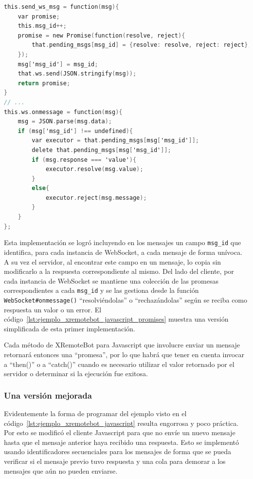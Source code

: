 \begin{lstlisting}[language=C,
caption={Ejemplo simplificado de la implementación de XRemoteBot con
Promises dentro del constructor Server en xremotebot.js},
label=lst:ejemplo_xremotebot_javascript_promises]
this.send_ws_msg = function(msg){
    var promise;
    this.msg_id++;
    promise = new Promise(function(resolve, reject){
        that.pending_msgs[msg_id] = {resolve: resolve, reject: reject};
    });
    msg['msg_id'] = msg_id;
    that.ws.send(JSON.stringify(msg));
    return promise;
}
// ...
this.ws.onmessage = function(msg){
    msg = JSON.parse(msg.data);
    if (msg['msg_id'] !== undefined){
        var executor = that.pending_msgs[msg['msg_id']];
        delete that.pending_msgs[msg['msg_id']];
        if (msg.response === 'value'){
            executor.resolve(msg.value);
        }
        else{
            executor.reject(msg.message);
        }
    }
};
\end{lstlisting}

Esta implementación se logró incluyendo en los mensajes un campo
\texttt{msg\_id} que identifica, para cada instancia de WebSocket, a
cada mensaje de forma unívoca. A su vez el servidor, al encontrar este
campo en un mensaje, lo copia sin modificarlo a la respuesta correspondiente
al mismo. Del lado del cliente, por cada instancia de WebSocket se mantiene
una colección de las promesas correspondientes
a cada \texttt{msg\_id} y se las gestiona desde la función
\texttt{WebSocket\#onmessage()} ``resolviéndolas'' o ``rechazándolas'' según
se reciba como respuesta un valor o un error. El
código~\ref{lst:ejemplo_xremotebot_javascript_promises} muestra una versión
simplificada de esta primer implementación.

Cada método de XRemoteBot para Javascript que involucre enviar un mensaje
retornará entonces una ``promesa'', por lo que habrá que tener en cuenta
invocar a ``then()'' o a ``catch()'' cuando es necesario
utilizar el valor retornado por el servidor o determinar si la ejecución fue exitosa.

\subsubsection{Una versión mejorada}

Evidentemente la forma de programar del ejemplo visto en el
código~\ref{lst:ejemplo_xremotebot_javascript}
resulta engorrosa y poco práctica.
Por esto se modificó el cliente Javascript para que no envíe un nuevo mensaje hasta
que el mensaje anterior haya recibido una respuesta. Esto se implementó usando
identificadores secuenciales para los mensajes de forma que se pueda verificar si
el mensaje previo tuvo respuesta y una cola para demorar a los mensajes que aún no
pueden enviarse.

